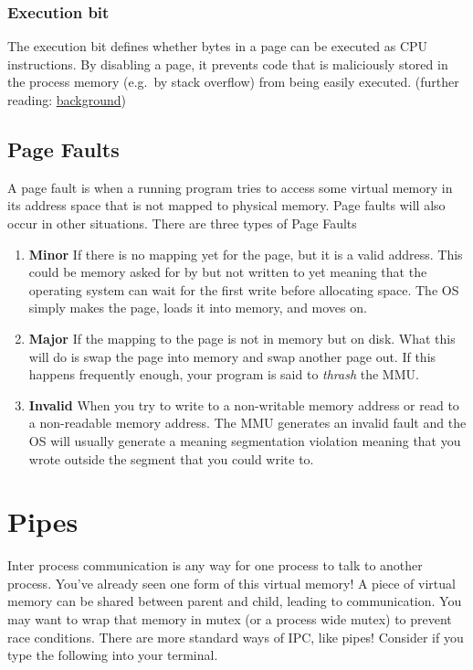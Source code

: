 \subsubsection{Execution bit}\label{execution-bit}
The execution bit defines whether bytes in a page can be executed as CPU instructions. By disabling a page, it prevents code that is maliciously stored in the process memory (e.g.~by stack overflow) from being easily executed. (further reading: \href{http://en.wikipedia.org/wiki/NX\_bit\#Hardware\_background}{background})

\subsection{Page Faults}

 A page fault is when a running program tries to access some virtual memory in its address space that is not mapped to physical memory. Page faults will also occur in other situations. There are three types of Page Faults

\begin{enumerate}
 \item \textbf{Minor} If there is no mapping yet for the page, but it is a valid address. This could be memory asked for by  but not written to yet meaning that the operating system can wait for the first write before allocating space. The OS simply makes the page, loads it into memory, and moves on.

 \item \textbf{Major} If the mapping to the page is not in memory but on disk. What this will do is swap the page into memory and swap another page out. If this happens frequently enough, your program is said to \emph{thrash} the MMU.

 \item \textbf{Invalid} When you try to write to a non-writable memory address or read to a non-readable memory address. The MMU generates an invalid fault and the OS will usually generate a  meaning segmentation violation meaning that you wrote outside the segment that you could write to.
\end{enumerate}

\section{Pipes}

Inter process communication is any way for one process to talk to another process. You've already seen one form of this virtual memory! A piece of virtual memory can be shared between parent and child, leading to communication. You may want to wrap that memory in  mutex (or a process wide mutex) to prevent race conditions. There are more standard ways of IPC, like pipes! Consider if you type the following into your terminal.

